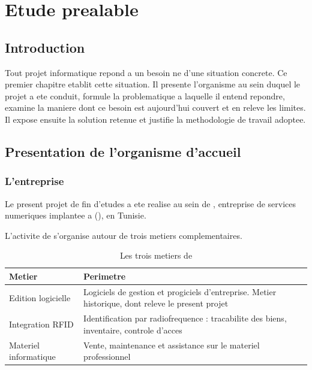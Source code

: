 \chapter{Etude prealable}
\label{chap:etude-prealable}

\section*{Introduction}

Tout projet informatique repond a un besoin ne d'une situation concrete.
Ce premier chapitre etablit cette situation. Il presente l'organisme au
sein duquel le projet a ete conduit, formule la problematique a laquelle
il entend repondre, examine la maniere dont ce besoin est aujourd'hui
couvert et en releve les limites. Il expose ensuite la solution retenue
et justifie la methodologie de travail adoptee.

\section{Presentation de l'organisme d'accueil}

\subsection{L'entreprise}

Le present projet de fin d'etudes a ete realise au sein de
\essentiel{\entreprise}, entreprise de services numeriques implantee a
\entrepriseVille{} (\entrepriseCodePostal), en Tunisie.

L'activite de \entreprise{} s'organise autour de trois metiers
complementaires.

\begin{table}[H]
\centering
\caption{Les trois metiers de \entreprise}
\label{tab:metiers-sipro}
\small
\begin{tabularx}{\textwidth}{@{}p{3.6cm}X@{}}
\toprule
\textbf{Metier} & \textbf{Perimetre} \\ \midrule
Edition logicielle & Logiciels de gestion et progiciels d'entreprise.
  Metier historique, dont releve le present projet \\
Integration RFID & Identification par radiofrequence : tracabilite des
  biens, inventaire, controle d'acces \\
Materiel informatique & Vente, maintenance et assistance sur le materiel
  professionnel \\
\bottomrule
\end{tabularx}
\end{table}

